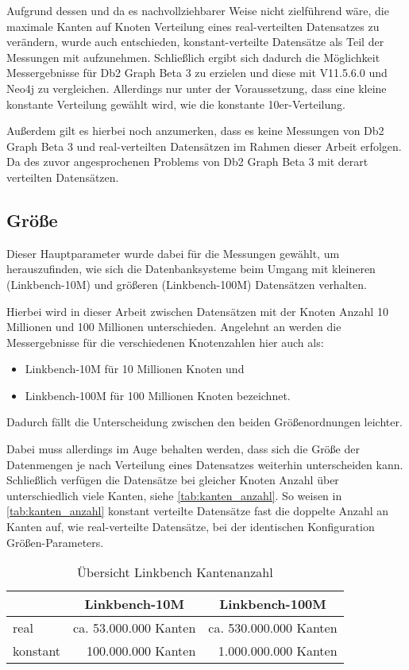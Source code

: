 Aufgrund dessen und da es nachvollziehbarer Weise nicht zielführend wäre, die maximale Kanten auf Knoten Verteilung eines real-verteilten Datensatzes zu verändern, wurde auch entschieden, konstant-verteilte Datensätze als Teil der Messungen mit aufzunehmen. Schließlich ergibt sich dadurch die Möglichkeit Messergebnisse für Db2 Graph Beta 3 zu erzielen und diese mit V11.5.6.0 und Neo4j zu vergleichen. Allerdings nur unter der Voraussetzung, dass eine kleine konstante Verteilung gewählt wird, wie die konstante 10er-Verteilung. 

Außerdem gilt es hierbei noch anzumerken, dass es keine Messungen von Db2 Graph Beta 3 und real-verteilten Datensätzen im Rahmen dieser Arbeit erfolgen. Da des zuvor angesprochenen Problems von Db2 Graph Beta 3 mit derart verteilten Datensätzen.

\subsection{Größe}
Dieser Hauptparameter wurde dabei für die Messungen gewählt, um herauszufinden, wie sich die Datenbanksysteme beim Umgang mit kleineren (Linkbench-10M) und größeren (Linkbench-100M) Datensätzen verhalten. 

Hierbei wird in dieser Arbeit zwischen Datensätzen mit der Knoten Anzahl 10 Millionen und 100 Millionen unterschieden. Angelehnt an \cite{sigmod_tian} werden die Messergebnisse für die verschiedenen Knotenzahlen hier auch als:
\begin{itemize}
    \item Linkbench-10M für 10 Millionen Knoten und 
    \item Linkbench-100M für 100 Millionen Knoten bezeichnet.
\end{itemize}
Dadurch fällt die Unterscheidung zwischen den beiden Größenordnungen leichter. 

Dabei muss allerdings im Auge behalten werden, dass sich die Größe der Datenmengen je nach Verteilung eines Datensatzes weiterhin unterscheiden kann. Schließlich verfügen die Datensätze bei gleicher Knoten Anzahl über unterschiedlich viele Kanten, siehe \autoref{tab:kanten_anzahl}. So weisen in \autoref{tab:kanten_anzahl} konstant verteilte Datensätze fast die doppelte Anzahl an Kanten auf, wie real-verteilte Datensätze, bei der identischen Konfiguration Größen-Parameters. 

\begin{table}[ht]
    \centering
    \begin{tabular}{l|r|r}
    \hline
    \rowcolor[HTML]{EFEFEF} 
    \multicolumn{1}{c|}{\cellcolor[HTML]{EFEFEF}\textbf{Verteilung}} & \multicolumn{1}{c|}{\cellcolor[HTML]{EFEFEF}\textbf{Linkbench-10M}} & \multicolumn{1}{c}{\cellcolor[HTML]{EFEFEF}\textbf{Linkbench-100M}} \\ \hline
    real & ca. 53.000.000 Kanten & ca. 530.000.000 Kanten \\
    konstant & 100.000.000 Kanten & 1.000.000.000 Kanten \\ \hline
    \end{tabular}
    \caption{Übersicht Linkbench Kantenanzahl}
    \label{tab:kanten_anzahl}
\end{table}

